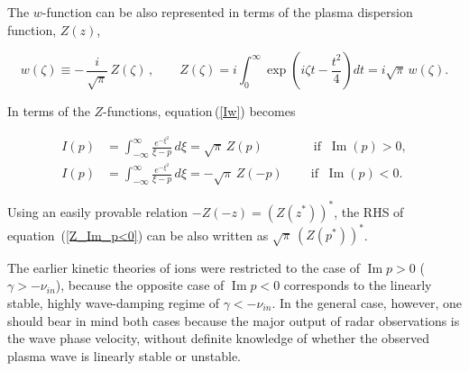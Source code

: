 \documentclass[draft]{agujournal2019}
\begin{document}
{The $w$-function can be also represented in
terms of the plasma dispersion function, $Z(z)$,
\begin{linenomath*}
\begin{equation}
w(\zeta)\equiv-\,\frac{i}{\sqrt{\pi}}\,Z(\zeta)\,,\qquad Z(\zeta)=i\int%
_{0}^{\infty}\exp\left(  i\zeta t-\frac{t^{2}}{4}\right)  dt=i\sqrt{\pi
}\,w(\zeta). 
\label{w->Z}
\end{equation}
\end{linenomath*}
In terms of the $Z$-functions, equation\,(\ref{Iw}) becomes
\begin{linenomath*}
\begin{subequations}
\begin{align}
I(p)  &  =\int_{-\infty}^{\infty}\frac{e^{-\xi^{2}}}{\xi-p}\,d\xi=\sqrt\pi\,
Z(p)\qquad\qquad\text{if}\;\;\operatorname{Im}(p)>0,\label{Z_Im_p>0}\\
I(p)  &  =\int_{-\infty}^{\infty}\frac{e^{-\xi^{2}}}{\xi-p}\,d\xi = -\sqrt\pi\,Z(-p)
\ \qquad\text{if}\;\;\operatorname{Im}(p)<0.
\label{Z_Im_p<0}
\end{align}
\label{Z_I}
\end{subequations}
\end{linenomath*}
Using an easily provable relation $-Z(-z)=(Z(z^{\ast}))^{\ast}$, the RHS of equation\ (\ref{Z_Im_p<0}) can be also written as $\sqrt\pi\,(Z(p^{\ast}))^{\ast}$.

The earlier kinetic theories of ions were restricted to the case of $\operatorname{Im}p>0$ ($\gamma>-\nu_{in}$), because the opposite case of
$\operatorname{Im}p<0$ corresponds to the linearly stable, highly wave-damping
regime of $\gamma<-\nu_{in}$. In the general case, however, one should bear in mind both cases 
because the major output of radar observations is the wave phase velocity, without definite knowledge of 
whether the observed plasma wave is linearly stable or unstable. 

}
\end{document}
